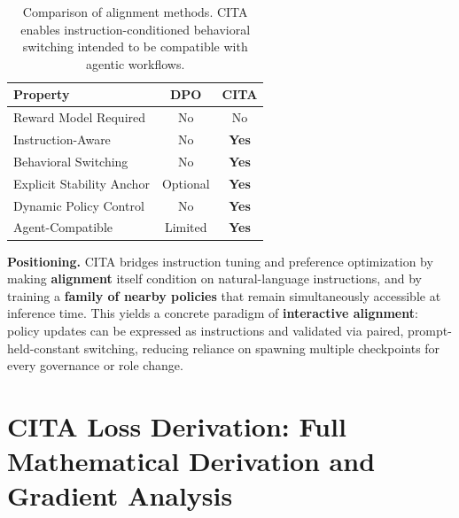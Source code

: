 \vspace{-2mm}
\begin{table}[H]
\centering
\small
\renewcommand{\arraystretch}{1.2}
\begin{tabular}{@{}lcc@{}}
\toprule
\textbf{Property} & \textbf{DPO} & \textbf{CITA} \\
\midrule
Reward Model Required & No & No \\ \hline
Instruction-Aware & No & \textbf{Yes} \\ \hline
Behavioral Switching & No & \textbf{Yes} \\ \hline
Explicit Stability Anchor & Optional & \textbf{Yes} \\ \hline
Dynamic Policy Control & No & \textbf{Yes} \\ \hline
Agent-Compatible & Limited & \textbf{Yes} \\
\bottomrule
\end{tabular}
\caption{Comparison of alignment methods. CITA enables instruction-conditioned behavioral switching intended to be compatible with agentic workflows.}
\label{tab:method_comparison}
\vspace{-4mm}
\end{table}

\noindent\textbf{Positioning.}
CITA bridges instruction tuning and preference optimization by making \textbf{alignment} itself condition on natural-language instructions, and by training a \textbf{family of nearby policies} that remain simultaneously accessible at inference time. This yields a concrete paradigm of \textbf{interactive alignment}: policy updates can be expressed as instructions and validated via paired, prompt-held-constant switching, reducing reliance on spawning multiple checkpoints for every governance or role change.





\section{CITA Loss Derivation: Full Mathematical Derivation and Gradient Analysis}
\label{sec:appendix_cita_kl}

\vspace{-0.35em}
